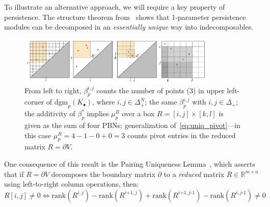 \documentclass[10pt]{article}
\numberwithin{equation}{section}
\newcommand{\+}{%
	\raisebox{0.18ex}{\scaleobj{0.55}{+}}
}
\theoremstyle{definition}
\theoremstyle{definition}
\begin{document}
To illustrate an alternative approach, we will require a key property of persistence. The structure theorem from~\cite{zomorodian2004computing} shows that 1-parameter persistence modules can be decomposed in an \emph{essentially unique} way into indecomposables.
\begin{figure}
\centering
	\includegraphics[width=0.85\textwidth]{betti_add}
	\caption{From left to right, $\beta_p^{i,j}$ counts the number of points (3) in upper left-corner of $\mathrm{dgm}_p(K_\bullet)$, where $i,j \in \Delta_+^N$; the same $\beta_p^{i,j}$  with $i,j \in \Delta_+$; the additivity of $\beta_p^{\ast}$ implies $\mu_p^{R}$ over a box $R=[i,j] \times [k,l]$ is given as the sum of four PBNs; generalization of~\ref{eq:uniq_pivot}---in this case $\mu_p^R = 4 - 1 - 0 + 0 = 3$ counts pivot entries in the reduced matrix $R = \partial V$.}
	\label{fig:mult}
\end{figure}
 One consequence of this result is the Pairing Uniqueness Lemma~\cite{edelsbrunner2000topological}, which asserts that if $R = \partial V$ decomposes the boundary matrix $\partial$ to a \emph{reduced} matrix $R \in \mathbb{R}^{m \times n}$ using left-to-right column operations, then:
\begin{equation}\label{eq:uniq_pivot}
R[i,j] \neq 0 \Leftrightarrow \mathrm{rank}(R^{i,j}) - \mathrm{rank}(R^{i\texttt{+}1,j}) + \mathrm{rank}(R^{i\texttt{+}1,j\text{-}1}) - \mathrm{rank}(R^{i,j\text{-}1}) \neq 0 
\end{equation}
\end{document}
